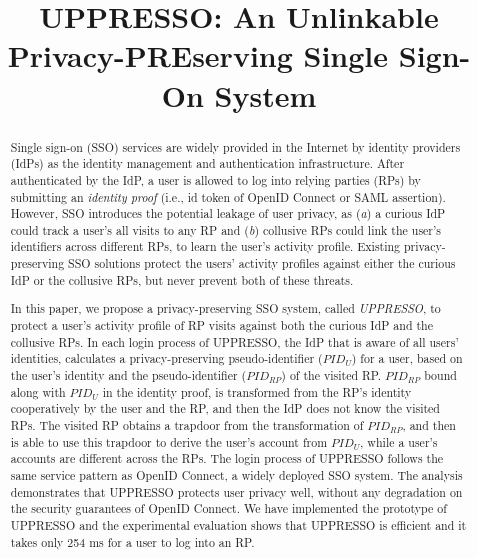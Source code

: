 \documentclass[conference, 10pt]{IEEEtran}
\begin{document}
\title{{UPPRESSO}: An Unlinkable Privacy-PREserving Single Sign-On System}
\maketitle
\begin{abstract}
Single sign-on (SSO) services
     are widely provided in the Internet by identity providers (IdPs) as the identity management
      and authentication infrastructure.
After authenticated by the IdP,
    a user is allowed to log into relying parties (RPs) by submitting an \emph{identity proof}
    (i.e., id token of OpenID Connect or SAML assertion).
However,
    SSO introduces the potential leakage of user privacy,
        as (\emph{a}) a curious IdP could track a user's all visits to any RP
            and (\emph{b}) collusive RPs could link the user's identifiers across different RPs,
            to learn the user's activity profile.
Existing privacy-preserving SSO solutions protect the users' activity profiles
    against either the curious IdP or the collusive RPs, but never prevent both of these threats.

In this paper, we propose a privacy-preserving SSO system, called \emph{UPPRESSO},
     to protect a user's activity profile of RP visits
        against both the curious IdP and the collusive RPs.
In each login process of UPPRESSO,
 the IdP that is aware of all users' identities,
         calculates a privacy-preserving pseudo-identifier ($PID_U$) for a user,
    based on the user's identity and the pseudo-identifier ($PID_{RP}$) of the visited RP.
$PID_{RP}$ bound along with $PID_U$ in the identity proof,
   is transformed from the RP's identity cooperatively by the user and the RP,
    and then the IdP does not know the visited RPs.
The visited RP obtains a trapdoor from the transformation of $PID_{RP}$,
    and then is able to use this trapdoor to derive the user's account from $PID_U$,
 while a user's accounts are different across the RPs.
The login process of UPPRESSO follows the same service pattern as OpenID Connect, a widely deployed SSO system.
The analysis demonstrates that UPPRESSO protects user privacy well, without any degradation on the security guarantees of OpenID Connect.
We have implemented the prototype of UPPRESSO and
 the experimental evaluation shows that UPPRESSO is efficient and
  it takes only 254 ms for a user to log into an RP.
\end{abstract}
\end{document}

